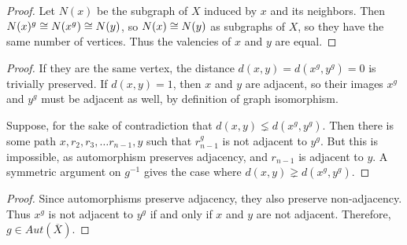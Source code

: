 
\begin{proof}
	Let $N(x)$ be the subgraph of $X$ induced by $x$ and its neighbors.  Then $N(x)^g\cong N(x^g)\cong N(y)$, so $N(x)\cong N(y)$ as subgraphs of $X$, so they have the same number of vertices.  Thus the valencies of $x$ and $y$ are equal.
\end{proof}





\begin{proof}
	If they are the same vertex, the distance $d(x,y)=d(x^g,y^g)=0$ is trivially preserved.  If $d(x,y)=1$, then $x$ and $y$ are adjacent, so their images $x^g$ and $y^g$ must be adjacent as well, by definition of graph isomorphism.
	
	Suppose, for the sake of contradiction that $d(x,y)\lneq d(x^g,y^g)$.  Then there is some path $x,r_2,r_3,\dots r_{n-1},y$ such that $r_{n-1}^g$ is not adjacent to $y^g$.  But this is impossible, as automorphism preserves adjacency, and $r_{n-1}$ is adjacent to $y$.  A symmetric argument on $g^{-1}$ gives the case where $d(x,y)\gneq d(x^g,y^g)$.
	
	
	
\end{proof}



\begin{proof}
	Since automorphisms preserve adjacency, they also preserve non-adjacency.  Thus $x^g$ is not adjacent to $y^g$ if and only if $x$ and $y$ are not adjacent.  Therefore, $g\in Aut(\overline{X})$.
\end{proof}

